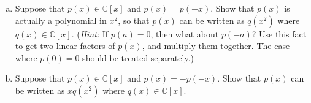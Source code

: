 \begin{exercise}{}
\begin{enumerate}[(a)]
\item
Suppose that $p(x) \in {\mathbb C}[x]$ and $p(x)=p(-x)$. Show that $p(x)$ is actually a polynomial in $x^2$, so that $p(x)$ can be written as $q(x^2)$ where   $q(x) \in {\mathbb C}[x]$. (\emph{Hint:} If $p(a)=0$, then what about $p(-a)$? Use this fact to get two linear factors of $p(x)$, and multiply them together. The case where $p(0)=0$ should be treated separately.)  
\item
Suppose that $p(x) \in {\mathbb C}[x]$ and $p(x)=-p(-x)$. Show that $p(x)$  can be written as $xq(x^2)$ where   $q(x) \in {\mathbb C}[x]$.
\end{enumerate}
\end{exercise}
